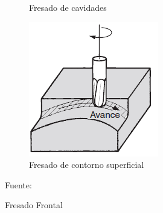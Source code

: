\begin{figure}[hbt]
\begin{subfigure}{0.25\textwidth}
        \caption{Fresado de cavidades}
        \label{fig:Fresadodecavidades}
    \end{subfigure}
    \begin{subfigure}{0.25\textwidth}
        \centering
        \includegraphics[width=0.9\linewidth]{Cap1_FormulaciondelProyecto/Figuras/f.PNG}
        \caption{Fresado de contorno superficial}
        \label{fig:FresadoCs}
    \end{subfigure}
    \caption{Fresado Frontal}{Fuente: \citep{groover2007fundamentals}}
    \label{fig:FresadoFrontal}
\end{figure} 


